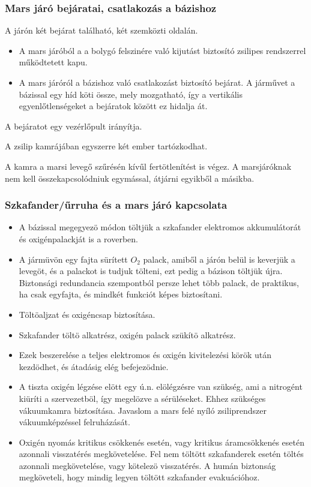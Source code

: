 \documentclass[12pt]{report}
\begin{document}
\subsubsection{Mars járó bejáratai, csatlakozás a bázishoz}
A járón  két bejárat található, két szemközti oldalán. 
\begin{itemize}
\item {}A mars járóból a a bolygó felszinére való kijutást biztosító zsilipes rendszerrel működtetett kapu.
\item {}A mars járóról a bázishoz való csatlakozást biztosító bejárat. A járművet a bázissal egy híd köti össze, mely mozgatható, így a vertikális egyenlőtlenségeket a bejáratok között ez hidalja át.
\end{itemize}

A bejáratot egy vezérlőpult irányítja.

A zsilip kamrájában egyszerre két ember tartózkodhat.

A kamra a marsi levegő szűrésén kívűl fertötlenítést is végez.
A marsjáróknak  nem kell összekapcsolódniuk egymással, átjárni egyikből a másikba.

\subsubsection{Szkafander/űrruha és a mars járó kapcsolata}
\begin{itemize}

  \item {} A bázissal megegyezö módon töltjük a szkafander elektromos akkumulátorát és oxigénpalackját is a roverben.
  \item {} A jármüvön egy fajta sürített \(O_2\) palack, amiből a járón belül is keverjük a levegöt, és a palackot is tudjuk tölteni, ezt pedig a bázison töltjük újra. Biztonsági redundancia szempontból persze lehet több palack, de praktikus, ha csak egyfajta, és mindkét funkciót képes biztosítani.
  \item {} Töltöaljzat és oxigéncsap biztosítása.
  \item {} Szkafander töltö alkatrész, oxigén palack szükítö alkatrész.
  \item Ezek beszerelése a teljes elektromos és oxigén kivitelezési körök után kezdödhet, és átadásig elég befejezödnie.
  \item {} A tiszta oxigén légzése elött egy ú.n. elölégzésre van szükség, ami a nitrogént kiüríti a szervezetböl, így megelözve a sérüléseket. Ehhez szükséges vákuumkamra biztosítása. Javaslom a mars felé nyíló zsiliprendszer vákuumképzéssel felruházását.
  \item {} Oxigén nyomás kritikus csökkenés esetén, vagy kritikus áramcsökkenés esetén azonnali visszatérés megkövetelése. Fel nem töltött szkafanderek esetén töltés azonnali megkövetelése, vagy kötelezö visszatérés. A humán biztonság megköveteli, hogy mindig legyen töltött szkafander evakuációhoz.
\end{itemize}
\end{document}
